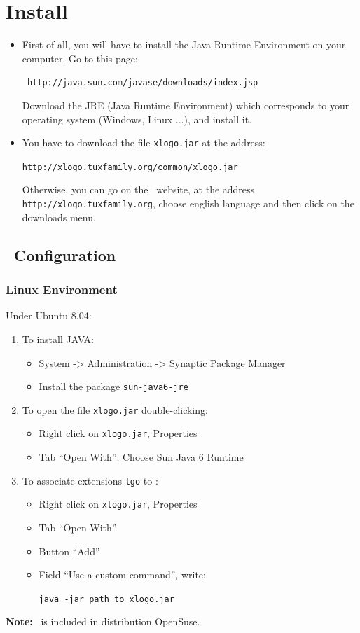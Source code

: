 \chapter{Install \xlogo}
\noindent \begin{itemize}
 \item First of all, you will have to install the Java Runtime Environment on your computer. Go to this page:
\begin{center}
\texttt{ http://java.sun.com/javase/downloads/index.jsp}
\end{center}
Download the JRE (Java Runtime Environment) which corresponds to your operating system (Windows, Linux ...), and install it. 
\item You have to download the file \texttt{xlogo.jar} at the address: 
\begin{center}
	\texttt{http://xlogo.tuxfamily.org/common/xlogo.jar}
\end{center}
Otherwise, you can go on the \xlogo\ website, at the address \texttt{http://xlogo.tuxfamily.org}, choose english language and then click on the downloads menu.
\end{itemize}
\section{\xlogo\ Configuration}
\subsection{Linux Environment}
Under Ubuntu 8.04:
\begin{enumerate}
 \item To install JAVA:
\begin{itemize}
 \item System -> Administration -> Synaptic Package Manager
 \item Install the package \texttt{sun-java6-jre}
\end{itemize}
 \item  To open the file \texttt{xlogo.jar} double-clicking:
\begin{itemize}
 \item Right click on \texttt{xlogo.jar}, Properties
 \item Tab ``Open With'': Choose Sun Java 6 Runtime 
\end{itemize}
 \item To associate extensions \texttt{lgo} to \xlogo:
\begin{itemize}
 \item Right click on \texttt{xlogo.jar}, Properties
 \item Tab ``Open With'' 
 \item Button ``Add''
 \item Field ``Use a custom command'', write:
\begin{center}
\texttt{java -jar path\_to\_xlogo.jar} 
\end{center}
\end{itemize}
\end{enumerate}
\textbf{Note:} \xlogo\ is included in distribution OpenSuse.

